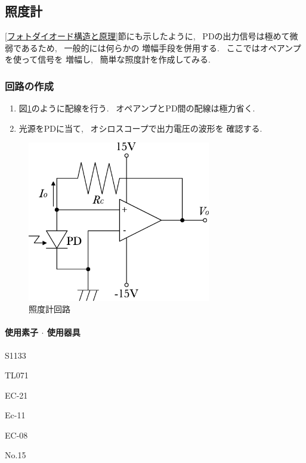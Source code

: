 \documentclass[titlepage]{jsarticle}
\begin{document}
    \subsection{照度計}
        \ref{フォトダイオード構造と原理}節にも示したように,
        ~PDの出力信号は極めて微弱であるため, ~一般的には何らかの
        増幅手段を併用する. ~ここではオペアンプを使って信号を
        増幅し, ~簡単な照度計を作成してみる.

        \subsubsection{回路の作成}
            \begin{enumerate}
                \item 図\ref{fig:照度計}のように配線を行う.
                    ~オペアンプとPD間の配線は極力省く.
                \item 光源をPDに当て, ~オシロスコープで出力電圧の波形を
                    確認する.
            \end{enumerate}

            \begin{figure}[ht]
                \centering
                \includegraphics[width=8cm]{images/light_meter.eps}
                \caption{照度計回路}
                \label{fig:照度計}
            \end{figure}

            \paragraph{使用素子 $\cdot$ 使用器具}
                \begin{description}
                    \setlength{\leftskip}{1.5em}
                    \item[PD] S1133
                    \item[オペアンプ] TL071
                    \item[デジタルマルチメータ] EC-21
                    \item[直流電源] Ec-11
                    \item[ブレッドボード] EC-08
                    \item[オシロスコープ] No.15  
                \end{description}
\end{document}
